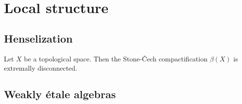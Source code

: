 \chapter{Local structure}

\section{Henselization}




\begin{theorem}
    Let \(X\) be a topological space. Then the Stone-Čech compactification \(\beta(X)\) is extremally disconnected.
    \label{thm:stone-cech-extremally-disconnected}
\end{theorem}



\section{Weakly étale algebras}

